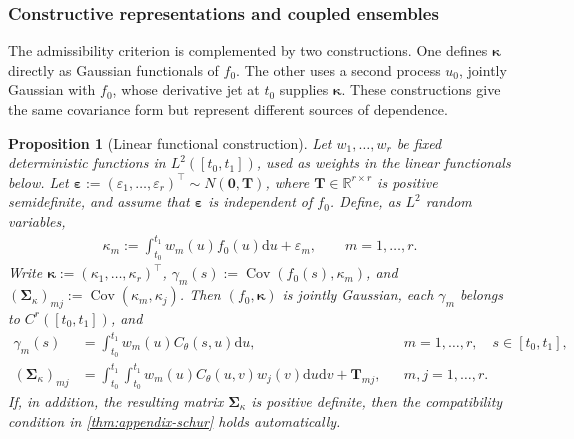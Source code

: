 \documentclass[11pt,a4paper]{article}
\newtheorem{proposition}{Proposition}
\theoremstyle{definition}
\theoremstyle{remark}
\DeclareMathOperator{\Cov}{Cov}
\begin{document}
\subsubsection{Constructive representations and coupled ensembles}
The admissibility criterion is complemented by two constructions. One defines \(\boldsymbol{\kappa}\) directly as Gaussian functionals of \(f_0\). The other uses a second process \(u_0\), jointly Gaussian with \(f_0\), whose derivative jet at \(t_0\) supplies \(\boldsymbol{\kappa}\). These constructions give the same covariance form but represent different sources of dependence.


\begin{proposition}[Linear functional construction]\label{prop:appendix-linear-functional}
Let \(w_1,\ldots,w_r\) be fixed deterministic functions in \(L^2([t_0,t_1])\), used as weights in the linear functionals below. Let $\boldsymbol{\varepsilon}:=(\varepsilon_1,\ldots,\varepsilon_r)^\top\sim N(\mathbf{0},\mathbf{T})$, where $\mathbf{T}\in\mathbb{R}^{r\times r}$ is positive semidefinite, and assume that $\boldsymbol{\varepsilon}$ is independent of $f_0$. Define, as $L^2$ random variables,
\begin{align*}
\kappa_m:=\int_{t_0}^{t_1}w_m(u)f_0(u)\mathrm{d}u+\varepsilon_m,
\qquad m=1,\ldots,r.
\end{align*}
Write $\boldsymbol{\kappa}:=(\kappa_1,\ldots,\kappa_r)^\top$, $\gamma_m(s):=\Cov(f_0(s),\kappa_m)$, and $(\boldsymbol{\Sigma}_{\kappa})_{mj}:=\Cov(\kappa_m,\kappa_j)$. Then $(f_0,\boldsymbol{\kappa})$ is jointly Gaussian, each \(\gamma_m\) belongs to \(C^r([t_0,t_1])\), and
\begin{align*}
\gamma_m(s)&=\int_{t_0}^{t_1}w_m(u)C_\theta(s,u)\mathrm{d}u, && m=1,\ldots,r,\quad s\in[t_0,t_1],\\
(\boldsymbol{\Sigma}_{\kappa})_{mj}&=\int_{t_0}^{t_1}\int_{t_0}^{t_1}w_m(u)C_\theta(u,v)w_j(v)\mathrm{d}u\mathrm{d}v+\mathbf{T}_{mj}, && m,j=1,\ldots,r.
\end{align*}
If, in addition, the resulting matrix $\boldsymbol{\Sigma}_{\kappa}$ is positive definite, then the compatibility condition in \cref{thm:appendix-schur} holds automatically.
\end{proposition}
\end{document}
